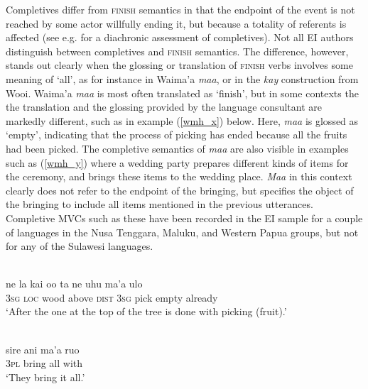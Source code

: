 Completives differ from \textsc{finish} semantics in that the endpoint of the event is not reached by some actor willfully ending it, but because a totality of referents is affected (see e.g. \citealt{bybee1994evolution} for a diachronic assessment of completives). Not all EI authors distinguish between completives and \textsc{finish} semantics. The difference, however, stands out clearly when the glossing or translation of \textsc{finish} verbs involves some meaning of `all', as for instance in Waima'a \textit{maa}, or in the  \textit{kay} construction from Wooi. Waima'a \textit{maa} is most often translated as `finish', but in some contexts the the translation and the glossing provided by the language consultant are markedly different, such as in example (\ref{wmh_x}) below. Here, \textit{maa} is glossed as `empty', indicating that the process of picking has ended because all the fruits had been picked. The completive semantics of \textit{maa} are also visible in examples such as (\ref{wmh_y}) where a wedding party prepares different kinds of items for the ceremony, and brings these items to the wedding place. \textit{Maa} in this context clearly does not refer to the endpoint of the bringing, but specifies the object of the bringing to include all items mentioned in the previous utterances. Completive MVCs such as these have been recorded in the EI sample for a couple of languages in the Nusa Tenggara, Maluku, and Western Papua groups, but not for any of the Sulawesi languages.

\ea \label{wmh_x}
\\
\gll ne la kai oo ta ne uhu ma'a ulo \\
3\textsc{sg} \textsc{loc} wood above \textsc{dist} 3\textsc{sg} pick empty already \\
\glft `After the one at the top of the tree is done with picking (fruit).'\\ 
\z

\ea \label{wmh_y}
\\
\gll sire ani ma'a  ruo \\
3\textsc{pl} bring all with \\
\glft `They bring it all.'\\ 
\z

